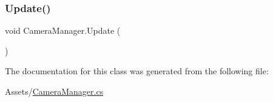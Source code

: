 \subsubsection{\texorpdfstring{Update()}{Update()}}
{\footnotesize\ttfamily void Camera\+Manager.\+Update (\begin{DoxyParamCaption}{ }\end{DoxyParamCaption})\hspace{0.3cm}{\ttfamily [private]}}



The documentation for this class was generated from the following file\+:\begin{DoxyCompactItemize}
\item 
Assets/\hyperlink{_camera_manager_8cs}{Camera\+Manager.\+cs}\end{DoxyCompactItemize}
